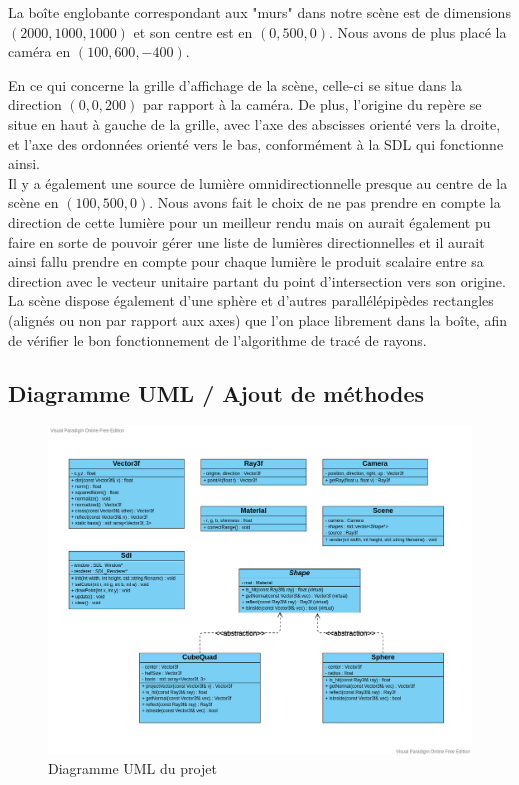 \documentclass[a4paper,oneside,12pt,titlepage]{article}
\begin{document}
\begin{sloppypar}
La boîte englobante correspondant aux "murs" dans notre scène est de dimensions $(2000,1000,1000)$ et son centre est en $(0,500,0)$. Nous avons de plus placé la caméra en $(100,600,-400)$. 

En ce qui concerne la grille d’affichage de la scène, celle-ci se situe dans la direction $(0,0,200)$ par rapport à la caméra. De plus, l’origine du repère se situe en haut à gauche de la grille, avec l’axe des abscisses orienté vers la droite, et l’axe des ordonnées orienté vers le bas, conformément à la SDL qui fonctionne ainsi. \\[6pt]

Il y a également une source de lumière omnidirectionnelle presque au centre de la scène en $(100,500,0)$. Nous avons fait le choix de ne pas prendre en compte la direction de cette lumière pour un meilleur rendu mais on aurait également pu faire en sorte de pouvoir gérer une liste de lumières directionnelles et il aurait ainsi fallu prendre en compte pour chaque lumière le produit scalaire entre sa direction avec le vecteur unitaire partant du point d'intersection vers son origine.\\[6pt]

La scène dispose également d’une sphère et d’autres parallélépipèdes rectangles (alignés ou non par rapport aux axes) que l’on place librement dans la boîte, afin de vérifier le bon fonctionnement de l’algorithme de tracé de rayons.

\newpage

\subsection{Diagramme UML / Ajout de méthodes}

\begin{figure}[!h]
    \centering
    \includegraphics[width=\linewidth]{./Diagramme_UML.png}
    \caption{Diagramme UML du projet}
    \label{fig:uml}
\end{figure}


\end{sloppypar}
\end{document}
